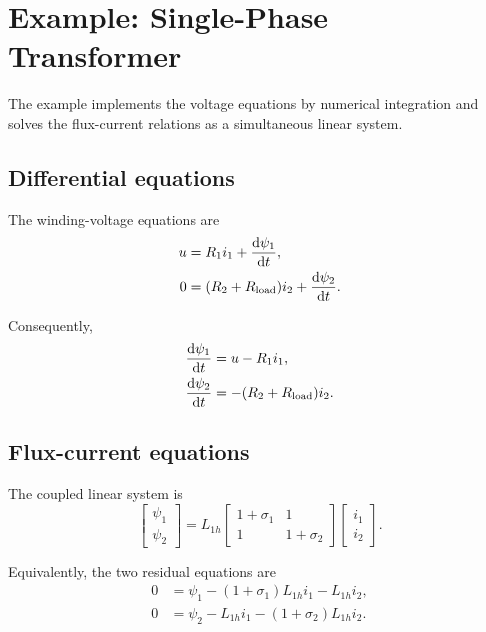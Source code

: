 \section{Example: Single-Phase Transformer}
\label{sec:behavioral-transformer-example}

The example implements the voltage equations by numerical integration and
solves the flux-current relations as a simultaneous linear system.

\subsection{Differential equations}

The winding-voltage equations are
\begin{align}
u &= R_1 i_1+\frac{\mathop{}\!\mathrm{d}\psi_1}{\mathop{}\!\mathrm{d} t},\\
0 &= (R_2+R_{\mathrm{load}})i_2
     +\frac{\mathop{}\!\mathrm{d}\psi_2}{\mathop{}\!\mathrm{d} t}.
\end{align}

Consequently,
\begin{align}
\frac{\mathop{}\!\mathrm{d}\psi_1}{\mathop{}\!\mathrm{d} t}&=u-R_1i_1,\\
\frac{\mathop{}\!\mathrm{d}\psi_2}{\mathop{}\!\mathrm{d} t}&=-(R_2+R_{\mathrm{load}})i_2.
\end{align}

\subsection{Flux-current equations}

The coupled linear system is
\begin{equation}
\begin{bmatrix}\psi_1\\\psi_2\end{bmatrix}
=L_{1h}
\begin{bmatrix}
1+\sigma_1 & 1\\
1 & 1+\sigma_2
\end{bmatrix}
\begin{bmatrix}i_1\\i_2\end{bmatrix}.
\label{eq:behavioral-transformer-matrix}
\end{equation}

Equivalently, the two residual equations are
\begin{align}
0&=\psi_1-(1+\sigma_1)L_{1h}i_1-L_{1h}i_2,\\
0&=\psi_2-L_{1h}i_1-(1+\sigma_2)L_{1h}i_2.
\end{align}

